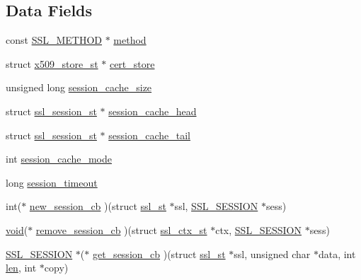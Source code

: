 \subsection*{Data Fields}
\begin{DoxyCompactItemize}
\item 
const \hyperlink{include_2openssl_2ssl_8h_a74d54b9a714accac31c73bfb55973e81}{S\+S\+L\+\_\+\+M\+E\+T\+H\+OD} $\ast$ \hyperlink{structssl__ctx__st_a6ad8f26b97b806807adf5b0dcebd3c2a}{method}
\item 
struct \hyperlink{structx509__store__st}{x509\+\_\+store\+\_\+st} $\ast$ \hyperlink{structssl__ctx__st_a8d14ba878fb2bbb67465414ad2718a64}{cert\+\_\+store}
\item 
unsigned long \hyperlink{structssl__ctx__st_a46d7ea9278a2e68216a1597cd0c07f27}{session\+\_\+cache\+\_\+size}
\item 
struct \hyperlink{structssl__session__st}{ssl\+\_\+session\+\_\+st} $\ast$ \hyperlink{structssl__ctx__st_acf8f625fb4d669eec6a3d83ad8a63b96}{session\+\_\+cache\+\_\+head}
\item 
struct \hyperlink{structssl__session__st}{ssl\+\_\+session\+\_\+st} $\ast$ \hyperlink{structssl__ctx__st_a167a310ce34e71f055f69422c0ae4a92}{session\+\_\+cache\+\_\+tail}
\item 
int \hyperlink{structssl__ctx__st_afa451b2723813ae5d7fc8506270df689}{session\+\_\+cache\+\_\+mode}
\item 
long \hyperlink{structssl__ctx__st_a8cf95f7b91066a57849b1eeec3657e4e}{session\+\_\+timeout}
\item 
int($\ast$ \hyperlink{structssl__ctx__st_a3961afac5a775516a8cc4f3721a8e1eb}{new\+\_\+session\+\_\+cb} )(struct \hyperlink{structssl__st}{ssl\+\_\+st} $\ast$ssl, \hyperlink{include_2openssl_2ssl_8h_a8dd6b81bbcb1b2d769235c37779d2a94}{S\+S\+L\+\_\+\+S\+E\+S\+S\+I\+ON} $\ast$sess)
\item 
\hyperlink{hw__4758__cca_8h_afad4d591c7931ff6dc5bf69c76c96aa0}{void}($\ast$ \hyperlink{structssl__ctx__st_a668d9020bff2b3dd5d4094964c3bf9a7}{remove\+\_\+session\+\_\+cb} )(struct \hyperlink{structssl__ctx__st}{ssl\+\_\+ctx\+\_\+st} $\ast$ctx, \hyperlink{include_2openssl_2ssl_8h_a8dd6b81bbcb1b2d769235c37779d2a94}{S\+S\+L\+\_\+\+S\+E\+S\+S\+I\+ON} $\ast$sess)
\item 
\hyperlink{include_2openssl_2ssl_8h_a8dd6b81bbcb1b2d769235c37779d2a94}{S\+S\+L\+\_\+\+S\+E\+S\+S\+I\+ON} $\ast$($\ast$ \hyperlink{structssl__ctx__st_aa8c8ffa3b89d9b23f825cad12307d13a}{get\+\_\+session\+\_\+cb} )(struct \hyperlink{structssl__st}{ssl\+\_\+st} $\ast$ssl, unsigned char $\ast$data, int \hyperlink{include_2openssl_2x509_8h_ad8c3db4434e9cb5cd772cc009f40e856}{len}, int $\ast$copy)

\end{DoxyCompactItemize}
